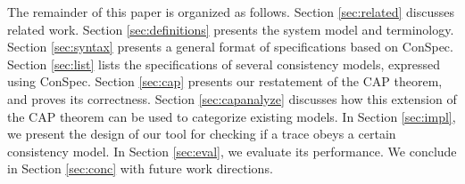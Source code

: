 \documentclass[journal,compsoc]{IEEEtran}
\begin{document}
The remainder of this paper is organized as follows. Section \ref{sec:related} discusses related work. Section  \ref{sec:definitions} presents the system model and terminology.  Section \ref{sec:syntax} presents a general format of specifications based on ConSpec. Section \ref{sec:list} lists the specifications of several consistency models, expressed using ConSpec. %
 Section \ref{sec:cap} presents our restatement of the CAP theorem, %
  and proves its correctness.  Section \ref{sec:capanalyze} discusses how this extension of the CAP theorem can be used to categorize existing models. %
 In Section \ref{sec:impl}, we present the design of our tool for checking if a trace obeys a certain consistency model. In Section  \ref{sec:eval}, we evaluate its performance. We conclude in Section \ref{sec:conc} with future work directions.  %

\end{document}
